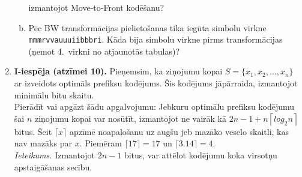 \documentclass[11pt]{article}
\begin{document}
\begin{enumerate}
\begin{enumerate}[(a)]
izmantojot Move-to-Front kodēšanu?
\item Pēc BW transformācijas pielietošanas tika iegūta simbolu virkne 
{\tt mmmrvvauuuiibbbri}. Kāda bija simbolu virkne pirms 
transformācijas (ņemot 4.\ virkni
no atjaunotās tabulas)?
\end{enumerate}
\item {\bf I-iespēja (atzīmei 10).} 
Pieņemsim, ka ziņojumu kopai $S = \{ x_1, x_2, \ldots, x_n \}$ ar 
izveidots optimāls prefiksu kodējums. Šis kodējums jāpārraida,
izmantojot minimālu bitu skaitu.\\
Pierādīt vai apgāzt šādu 
apgalvojumu: Jebkuru optimālu prefiksu 
kodējumu šai $n$ ziņojumu kopai var nosūtīt, izmantojot ne vairāk kā 
${\displaystyle 2n - 1 + n \left\lceil log_2 n \right\rceil}$ bitus. 
Šeit $\lceil x \rceil$ apzīmē noapaļošanu uz augšu jeb 
mazāko veselo skaitli, kas nav mazāks par $x$.
Piemēram $\lceil 17 \rceil = 17$ un $\lceil 3.14 \rceil = 4$.\\
{\em Ieteikums.} Izmantojot $2n-1$ bitus, var attēlot kodējumu koka 
virsotņu apstaigāšanas secību.


\end{enumerate}


%

\end{document}
